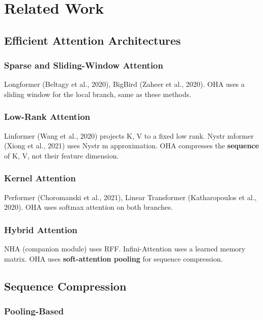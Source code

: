 
\section{Related Work}

\subsection{Efficient Attention Architectures}

\subsubsection{Sparse and Sliding-Window Attention}

Longformer (Beltagy et al., 2020), BigBird (Zaheer et al., 2020). OHA 
uses a sliding window for the local branch, same as these methods.

\subsubsection{Low-Rank Attention}

Linformer (Wang et al., 2020) projects K, V to a fixed low rank. 
Nystr mformer (Xiong et al., 2021) uses Nystr m approximation. OHA 
compresses the \textbf{sequence} of K, V, not their feature dimension.

\subsubsection{Kernel Attention}

Performer (Choromanski et al., 2021), Linear Transformer (Katharopoulos 
et al., 2020). OHA uses softmax attention on both branches.

\subsubsection{Hybrid Attention}

NHA (companion module) uses RFF. Infini-Attention uses a learned memory 
matrix. OHA uses \textbf{soft-attention pooling} for sequence compression.

\subsection{Sequence Compression}

\subsubsection{Pooling-Based}

